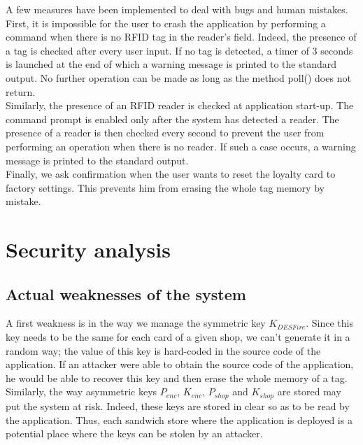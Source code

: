 \documentclass[a4paper,11pt,oneside]{article}
\begin{document}
A few measures have been implemented to deal with bugs and human mistakes. First, it is impossible for the user to crash the application by performing a command when there is no RFID tag in the reader's field. Indeed, the presence of a tag is checked after every user input. If no tag is detected, a timer of 3 seconds is launched at the end of which a warning message is printed to the standard output. No further operation can be made as long as the method poll() does not return. \\

Similarly, the presence of an RFID reader is checked at application start-up. The command prompt is enabled only after the system has detected a reader. The presence of a reader is then checked every second to prevent the user from performing an operation when there is no reader. If such a case occurs, a warning message is printed to the standard output. \\ 

Finally, we ask confirmation when the user wants to reset the loyalty card to factory settings. This prevents him from erasing the whole tag memory by mistake. \\ 


\newpage
\section{Security analysis}

\subsection{Actual weaknesses of the system}

A first weakness is in the way we manage the symmetric key $K_{DESFire}$. Since this key needs to be the same for each card of a given shop, we can't generate it in a random way; the value of this key is hard-coded in the source code of the application. If an attacker were able to obtain the source code of the application, he would be able to recover this key and then erase the whole memory of a tag. \\

Similarly, the way asymmetric keys $P_{enc}$, $K_{enc}$, $P_{shop}$ and $K_{shop}$ are stored may put the system at risk. Indeed, these keys are stored in clear so as to be read by the application. Thus, each sandwich store where the application is deployed is a potential place where the keys can be stolen by an attacker.\\
\end{document}
